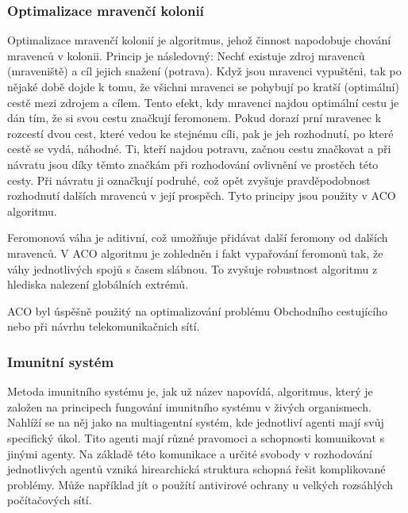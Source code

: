 \documentclass[bc,male,java,dept460]{diploma}		%
\begin{document}
\subsubsection{Optimalizace mravenčí kolonií}
\par Optimalizace mravenčí kolonií je algoritmus, jehož činnost napodobuje chování mravenců v kolonii. Princip je následovný: Nechť existuje zdroj mravenců (mraveniště) a cíl jejich snažení (potrava). Když jsou mravenci vypuštěni, tak po nějaké době dojde k tomu, že všichni mravenci se pohybují po kratší (optimální) cestě mezi zdrojem a cílem. Tento efekt, kdy mravenci najdou optimální cestu je dán tím, že si svou cestu značkují feromonem. Pokud dorazí prní mravenec k rozcestí dvou cest, které vedou ke stejnému cíli, pak je jeh rozhodnutí, po které cestě se vydá, náhodné. Ti, kteří najdou potravu, začnou cestu značkovat a při návratu jsou díky těmto značkám při rozhodování ovlivnění ve prostěch této cesty. Při návratu ji označkují podruhé, což opět zvyšuje pravděpodobnost rozhodnutí dalších mravenců v její prospěch. Tyto principy jsou použity v ACO algoritmu.
\par Feromonová váha je aditivní, což umožňuje přidávat další feromony od dalších mravenců. V ACO algoritmu je zohledněn i fakt vypařování feromonů tak, že váhy jednotlivých spojů s časem slábnou. To zvyšuje robustnost algoritmu z hlediska nalezení globálních extrémů.
\par ACO byl úspěšně použitý na optimalizování problému Obchodního cestujícího nebo při návrhu telekomunikačnich sítí.

\subsubsection{Imunitní systém}
Metoda imunitního systému je, jak už název napovídá, algoritmus, který je založen na principech fungování imunitního systému v živých organismech. Nahlíží se na něj jako na multiagentní systém, kde jednotliví agenti mají svůj specifický úkol. Tito agenti mají různé pravomoci a schopnosti komunikovat s jinými agenty. Na základě této komunikace a určité svobody v rozhodování jednotlivých agentů vzniká hirearchická struktura schopná řešit komplikované problémy. Může například jít o použítí antivirové ochrany u velkých rozsáhlých počítačových sítí.
\end{document}
